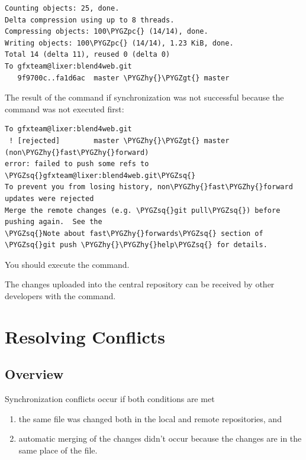 \documentclass[a4paper,12pt,oneside]{sphinxmanual}
\def\PYGZgt{\char`\>}
\def\PYGZpc{\char`\%}
\def\PYGZhy{\char`\-}
\def\PYGZsq{\char`\'}
\begin{document}
\begin{Verbatim}[commandchars=\\\{\}]
Counting objects: 25, done.
Delta compression using up to 8 threads.
Compressing objects: 100\PYGZpc{} (14/14), done.
Writing objects: 100\PYGZpc{} (14/14), 1.23 KiB, done.
Total 14 (delta 11), reused 0 (delta 0)
To gfxteam@lixer:blend4web.git
   9f9700c..fa1d6ac  master \PYGZhy{}\PYGZgt{} master
\end{Verbatim}

The result of the  command if synchronization was not successful because the  command was not executed first:

\begin{Verbatim}[commandchars=\\\{\}]
To gfxteam@lixer:blend4web.git
 ! [rejected]        master \PYGZhy{}\PYGZgt{} master (non\PYGZhy{}fast\PYGZhy{}forward)
error: failed to push some refs to \PYGZsq{}gfxteam@lixer:blend4web.git\PYGZsq{}
To prevent you from losing history, non\PYGZhy{}fast\PYGZhy{}forward updates were rejected
Merge the remote changes (e.g. \PYGZsq{}git pull\PYGZsq{}) before pushing again.  See the
\PYGZsq{}Note about fast\PYGZhy{}forwards\PYGZsq{} section of \PYGZsq{}git push \PYGZhy{}\PYGZhy{}help\PYGZsq{} for details.
\end{Verbatim}

You should execute the  command.

The changes uploaded into the central repository can be received by other developers with the  command.


\section{Resolving Conflicts}
\label{git_short_manual:index-7}\label{git_short_manual:id16}

\subsection{Overview}
\label{git_short_manual:id17}
Synchronization conflicts occur if both conditions are met
\begin{enumerate}
\item {} 
the same file was changed both in the local and remote repositories, and

\item {} 
automatic merging of the changes didn't occur because the changes are in the same place of the file.

\end{enumerate}
\end{document}
